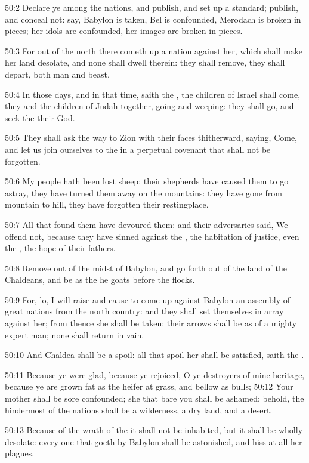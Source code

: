 50:2 Declare ye among the nations, and publish, and set up a standard;
publish, and conceal not: say, Babylon is taken, Bel is confounded,
Merodach is broken in pieces; her idols are confounded, her images are
broken in pieces.

50:3 For out of the north there cometh up a nation against her, which
shall make her land desolate, and none shall dwell therein: they shall
remove, they shall depart, both man and beast.

50:4 In those days, and in that time, saith the \LORD, the children of
Israel shall come, they and the children of Judah together, going and
weeping: they shall go, and seek the \LORD their God.

50:5 They shall ask the way to Zion with their faces thitherward,
saying, Come, and let us join ourselves to the \LORD in a perpetual
covenant that shall not be forgotten.

50:6 My people hath been lost sheep: their shepherds have caused them
to go astray, they have turned them away on the mountains: they have
gone from mountain to hill, they have forgotten their restingplace.

50:7 All that found them have devoured them: and their adversaries
said, We offend not, because they have sinned against the \LORD, the
habitation of justice, even the \LORD, the hope of their fathers.

50:8 Remove out of the midst of Babylon, and go forth out of the land
of the Chaldeans, and be as the he goats before the flocks.

50:9 For, lo, I will raise and cause to come up against Babylon an
assembly of great nations from the north country: and they shall set
themselves in array against her; from thence she shall be taken: their
arrows shall be as of a mighty expert man; none shall return in vain.

50:10 And Chaldea shall be a spoil: all that spoil her shall be
satisfied, saith the \LORD.

50:11 Because ye were glad, because ye rejoiced, O ye destroyers of
mine heritage, because ye are grown fat as the heifer at grass, and
bellow as bulls; 50:12 Your mother shall be sore confounded; she that
bare you shall be ashamed: behold, the hindermost of the nations shall
be a wilderness, a dry land, and a desert.

50:13 Because of the wrath of the \LORD it shall not be inhabited, but
it shall be wholly desolate: every one that goeth by Babylon shall be
astonished, and hiss at all her plagues.

